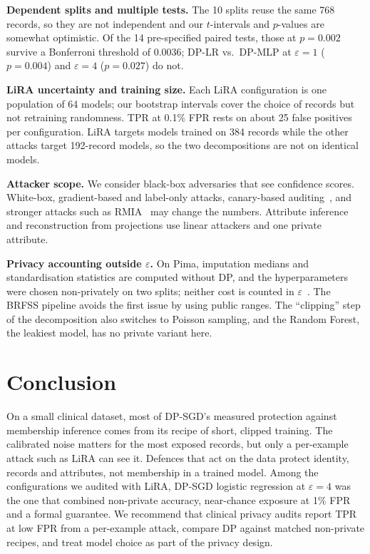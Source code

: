 \documentclass[conference]{IEEEtran}
\newcommand{\eps}{\varepsilon}
\begin{document}
\textbf{Dependent splits and multiple tests.} The 10 splits reuse the same 768 records, so they are not independent and our $t$-intervals and $p$-values are somewhat optimistic. Of the 14 pre-specified paired tests, those at $p{=}0.002$ survive a Bonferroni threshold of 0.0036; DP-LR vs.\ DP-MLP at $\eps{=}1$ ($p{=}0.004$) and $\eps{=}4$ ($p{=}0.027$) do not.

\textbf{LiRA uncertainty and training size.} Each LiRA configuration is one population of 64 models; our bootstrap intervals cover the choice of records but not retraining randomness. TPR at 0.1\% FPR rests on about 25 false positives per configuration. LiRA targets models trained on 384 records while the other attacks target 192-record models, so the two decompositions are not on identical models.

\textbf{Attacker scope.} We consider black-box adversaries that see confidence scores. White-box, gradient-based and label-only attacks, canary-based auditing~\cite{nasr2023}, and stronger attacks such as RMIA~\cite{zarifzadeh2024} may change the numbers. Attribute inference and reconstruction from projections use linear attackers and one private attribute.

\textbf{Privacy accounting outside $\eps$.} On Pima, imputation medians and standardisation statistics are computed without DP, and the hyperparameters were chosen non-privately on two splits; neither cost is counted in $\eps$~\cite{papernot2022}. The BRFSS pipeline avoids the first issue by using public ranges. The ``clipping'' step of the decomposition also switches to Poisson sampling, and the Random Forest, the leakiest model, has no private variant here.

\section{Conclusion}
On a small clinical dataset, most of DP-SGD's measured protection against membership inference comes from its recipe of short, clipped training. The calibrated noise matters for the most exposed records, but only a per-example attack such as LiRA can see it. Defences that act on the data protect identity, records and attributes, not membership in a trained model. Among the configurations we audited with LiRA, DP-SGD logistic regression at $\eps{=}4$ was the one that combined non-private accuracy, near-chance exposure at 1\% FPR and a formal guarantee. We recommend that clinical privacy audits report TPR at low FPR from a per-example attack, compare DP against matched non-private recipes, and treat model choice as part of the privacy design.
\end{document}
